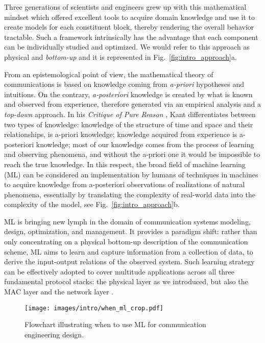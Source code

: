 Three generations of scientists and engineers grew up with this mathematical mindset which offered excellent tools to acquire domain knowledge and use it to create models for each constituent block, thereby rendering the overall behavior tractable. Such a framework intrinsically has the advantage that each component can be individually studied and optimized. We would refer to this approach as physical and \textit{bottom-up} and it is represented in Fig.~\ref{fig:intro_approach}a.

From an epistemological point of view, the mathematical theory of communications is based on knowledge coming from \textit{a-priori} hypotheses and intuitions. On the contrary, \textit{a-posteriori} knowledge is created by what is known and observed from experience, therefore generated via an empirical analysis and a \textit{top-down} approach. In his \textit{Critique of Pure Reason} \cite{Kant}, Kant differentiates between two types of knowledge: knowledge of the structure of time and space and their relationships, is a-priori knowledge; knowledge acquired from experience is a-posteriori knowledge; most of our knowledge comes from the process of learning and observing phenomena, and without the a-priori one it would be impossible to reach the true knowledge. 
In this respect, the broad field of machine learning (ML) \cite{Bishop2006,DLBook} can be considered an implementation by humans of techniques in machines to acquire knowledge from a-posteriori observations of realizations of natural phenomena, essentially by translating the complexity of real-world data into the complexity of the model, see Fig.~\ref{fig:intro_approach}b. 

ML is bringing new lymph in the domain of communication systems modeling, design, optimization, and management. It provides a paradigm shift: rather than only concentrating on a physical bottom-up description of the communication scheme, ML aims to learn and capture information from a collection of data, to derive the input-output relations of the observed system. Such learning strategy can be effectively adopted to cover multitude applications across all three fundamental protocol stacks: the physical layer as we introduced, but also the MAC layer and the network layer \cite{Simeone2018}.

\begin{figure}
	\centering
	\texttt{[image: images/intro/when\_ml\_crop.pdf]}
	\caption{Flowchart illustrating when to use ML for communication engineering design.}
	\label{fig:intro_when_ml}
\end{figure}

